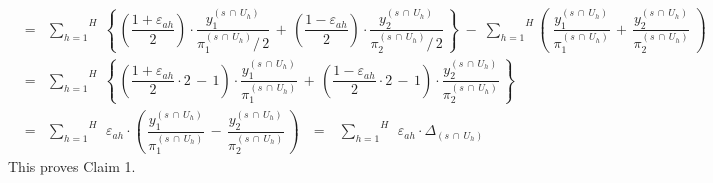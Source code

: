 \begin{enumerate}
\begin{eqnarray*}
	& = &
		\overset{H}{\underset{h=1}{\sum}}\;
		\left\{\,
			\left(\dfrac{1+\varepsilon_{ah}}{2}\right)\cdot\dfrac{y^{(s\,\cap\,U_{h})}_{1}}{\pi^{(s\,\cap\,U_{h})}_{1}/\,2}
			\,+\,
			\left(\dfrac{1-\varepsilon_{ah}}{2}\right)\cdot\dfrac{y^{(s\,\cap\,U_{h})}_{2}}{\pi^{(s\,\cap\,U_{h})}_{2}/\,2}
			\,\right\}
		\; - \;
		\overset{H}{\underset{h = 1}{\sum}}\left(\;
			\dfrac{y^{(s\,\cap\,U_{h})}_{1}}{\pi^{(s\,\cap\,U_{h})}_{1}}
			\,+\,
			\dfrac{y^{(s\,\cap\,U_{h})}_{2}}{\pi^{(s\,\cap\,U_{h})}_{2}}
			\;\right)
	\\
	& = &
		\overset{H}{\underset{h=1}{\sum}}\;
		\left\{\,
			\left(\dfrac{1+\varepsilon_{ah}}{2}\cdot 2 \,-\, 1\right)
			\cdot
			\dfrac{y^{(s\,\cap\,U_{h})}_{1}}{\pi^{(s\,\cap\,U_{h})}_{1}}
			\,+\,
			\left(\dfrac{1-\varepsilon_{ah}}{2}\cdot 2 \,-\, 1 \right)
			\cdot
			\dfrac{y^{(s\,\cap\,U_{h})}_{2}}{\pi^{(s\,\cap\,U_{h})}_{2}}
			\,\right\}
	\\
	& = &
		\overset{H}{\underset{h=1}{\sum}}\;\, \varepsilon_{ah} \cdot
		\left(\,
			 \dfrac{y^{(s\,\cap\,U_{h})}_{1}}{\pi^{(s\,\cap\,U_{h})}_{1}}
			\,-\,
			\dfrac{y^{(s\,\cap\,U_{h})}_{2}}{\pi^{(s\,\cap\,U_{h})}_{2}}
			\,\right)
	\;\;\, = \;\;\,
		\overset{H}{\underset{h=1}{\sum}}\;\, \varepsilon_{ah} \cdot \Delta_{(s\,\cap\,U_{h})}
	\end{eqnarray*}
	This proves Claim 1.


\end{enumerate}
